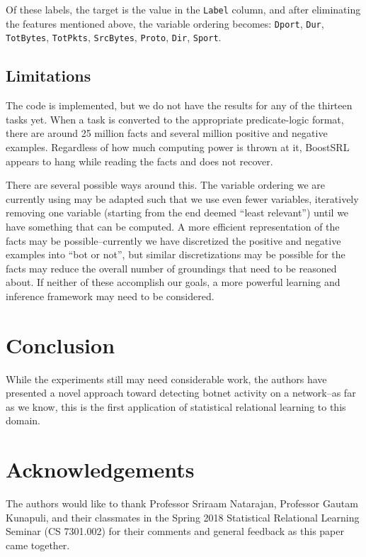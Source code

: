 \documentclass[letterpaper]{article}
\begin{document}
Of these labels, the target is the value in the \texttt{Label} column, and after eliminating the features mentioned above, the variable ordering becomes: \texttt{Dport}, \texttt{Dur}, \texttt{TotBytes}, \texttt{TotPkts}, \texttt{SrcBytes}, \texttt{Proto}, \texttt{Dir}, \texttt{Sport}.

\subsection{Limitations}

The code is implemented, but we do not have the results for any of the thirteen tasks yet. When a task is converted to the appropriate predicate-logic format, there are around 25 million facts and several million positive and negative examples. Regardless of how much computing power is thrown at it, BoostSRL appears to hang while reading the facts and does not recover.

There are several possible ways around this. The variable ordering we are currently using may be adapted such that we use even fewer variables, iteratively removing one variable (starting from the end deemed ``least relevant'') until we have something that can be computed.  A more efficient representation of the facts may be possible--currently we have discretized the positive and negative examples into ``bot or not'', but similar discretizations may be possible for the facts may reduce the overall number of groundings that need to be reasoned about.  If neither of these accomplish our goals, a more powerful learning and inference framework may need to be considered.

\section{Conclusion}

While the experiments still may need considerable work, the authors have presented a novel approach toward detecting botnet activity on a network--as far as we know, this is the first application of statistical relational learning to this domain.

\section{Acknowledgements}

The authors would like to thank Professor Sriraam Natarajan, Professor Gautam Kunapuli, and their classmates in the Spring 2018 Statistical Relational Learning Seminar (CS 7301.002) for their comments and general feedback as this paper came together.

\clearpage



\end{document}
